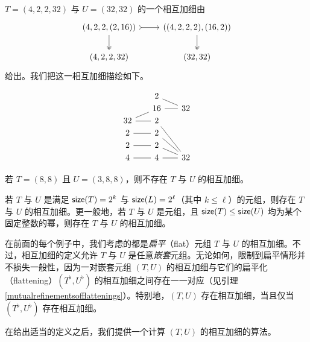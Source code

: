 \begin{example}
$T = (4, 2, 2, 32)$ 与 $U = (32, 32)$ 的一个相互加细由
    \[ \begin{tikzcd}
 (4,2,2,(2,16))\ar[r,rightarrowtail] \ar[d, two heads] & ((4,2,2,2),(16,2)) \ar[d,two heads] \\
(4,2,2,32) & (32,32)
\end{tikzcd} \]
给出。我们把这一相互加细描绘如下。

\[ \begin{tikzcd} [row sep = 1, column sep = 8]
 & & 2 & & \\
 & & 16 & & \ar[ll,-]\ar[ull,-]32\\
32\ar[rr,-] \ar[urr,-]  & & 2 & & \\
2\ar[rr,-]  & & 2 & & \\
2\ar[rr,-]  & & 2 & & \\
4 \ar[rr,-] & & 4 & & \ar[ll,-]\ar[ull,-]\ar[uull,-]\ar[uuull,-] 32\\
\end{tikzcd} \]
\end{example}

\begin{example}
    若 $T = (8,8)$ 且 $U = (3,8,8)$，则不存在 $T$ 与 $U$ 的相互加细。
\end{example}

\begin{example}
    若 $T$ 与 $U$ 是满足 $\mathsf{size}(T) = 2^k$ 与 $\mathsf{size}(L) = 2^\ell$（其中 $k \leq \ell$）的元组，则存在 $T$ 与 $U$ 的相互加细。更一般地，若 $T$ 与 $U$ 是元组，且 $\mathsf{size}(T) \leq \mathsf{size}(U)$ 均为某个固定整数的幂，则存在 $T$ 与 $U$ 的相互加细。
\end{example}

\begin{observation} 在前面的每个例子中，我们考虑的都是{\it 扁平}（flat）元组 $T$ 与 $U$ 的相互加细。不过，相互加细的定义允许 $T$ 与 $U$ 是任意{\it 嵌套}元组。无论如何，限制到扁平情形并不损失一般性，因为一对嵌套元组 $(T,U)$ 的相互加细与它们的扁平化（flattening）$(T^\flat,U^\flat)$ 的相互加细之间存在一一对应（见引理 \ref{mutualrefinementsofflattenings}）。特别地，$(T,U)$ 存在相互加细，当且仅当 $(T^\flat,U^\flat)$ 存在相互加细。
\end{observation}

在给出适当的定义之后，我们提供一个计算 $(T,U)$ 的相互加细的算法。

